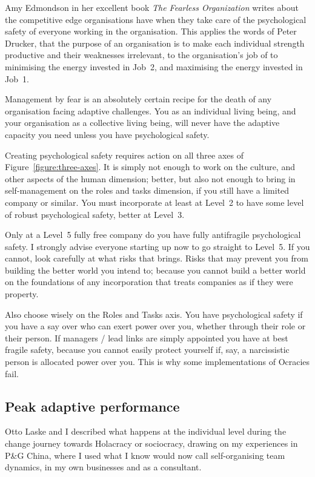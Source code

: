 Amy Edmondson  in her excellent book \emph{The Fearless Organization}\cite{edmondson-fearless} writes about the competitive edge organisations have when they take care of the psychological safety of everyone working in the organisation. This applies the words of Peter Drucker,  that the purpose of an organisation is to make each individual strength productive and their weaknesses irrelevant, to the organisation’s job of to minimising the energy invested in Job~2, and maximising the energy invested in Job~1.


Management by fear is an absolutely certain recipe for the death of any organisation facing adaptive challenges. You as an individual living being, and your organisation as a collective living being, will never have the adaptive capacity you need unless you have psychological safety.


Creating psychological safety   requires action on all three axes of Figure~\ref{figure:three-axes}. It is simply not enough to work on the culture, and other aspects of the human dimension; better, but also not enough to bring in self-management on the roles and tasks dimension, if you still have a limited company or similar. You must incorporate at least at Level~2 to have some level of robust psychological safety, better at Level~3. 


Only at a Level~5 fully free company do you have fully antifragile psychological safety. I strongly advise everyone starting up now to go straight to Level~5. If you cannot, look carefully at what risks that brings. Risks that may prevent you from building the better world you intend to; because you cannot build a better world on the foundations of any incorporation that treats companies as if they were property. 


Also choose wisely on the Roles and Tasks axis. You have psychological safety if you have a say over who can exert power over you, whether through their role or their person. If managers / lead links are simply appointed you have at best fragile safety, because you cannot easily protect yourself if, say, a narcissistic person is allocated power over you. This is why some implementations of Ocracies fail. 
\subsection{Peak adaptive performance}
\label{section:vygotsky}
Otto Laske  and I described what happens at the individual level during the change journey towards Holacracy or sociocracy, drawing on my experiences in P\&G China, where I used what I know would now call self-organising team dynamics, in my own businesses and as a consultant.


